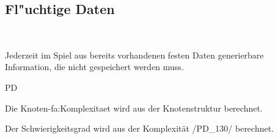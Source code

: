 %
%


\subsection{Fl{"u}chtige Daten}~\\
\label{DT:fluechtDat}

Jederzeit im Spiel aus bereits vorhandenen festen Daten generierbare Information, die nicht gespeichert werden muss.



\begin{ids}{\gls{PD}}

	\id[130] Die Knoten-\gls{fa:Komplexitaet} wird aus der Knotenstruktur berechnet.
	
	\id[140] Der Schwierigkeitsgrad wird aus der Komplexität /PD\_130/ berechnet.
		

\end{ids}





